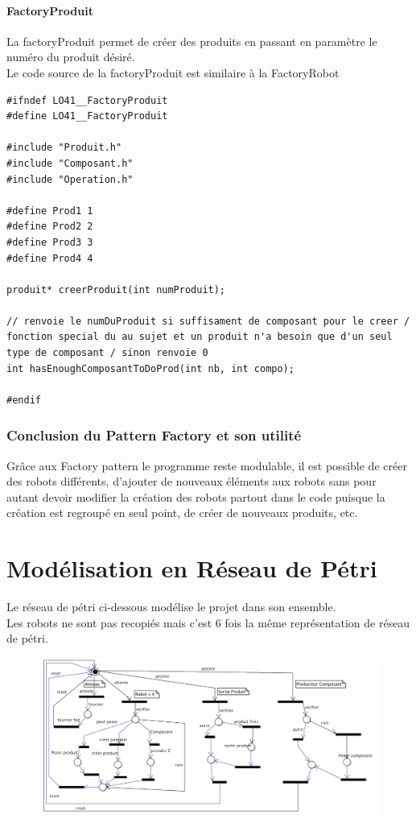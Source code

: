 \documentclass{report}
\begin{document}
\subsubsection{FactoryProduit}
La factoryProduit permet de créer des produits en passant en paramètre le numéro du produit désiré.\\
Le code source de la factoryProduit est similaire à la FactoryRobot
\begin{lstlisting}[caption=Factory des Produits]
#ifndef LO41__FactoryProduit
#define LO41__FactoryProduit

#include "Produit.h"
#include "Composant.h"
#include "Operation.h"

#define Prod1 1
#define Prod2 2
#define Prod3 3
#define Prod4 4

produit* creerProduit(int numProduit);

// renvoie le numDuProduit si suffisament de composant pour le creer / fonction special du au sujet et un produit n'a besoin que d'un seul type de composant / sinon renvoie 0
int hasEnoughComposantToDoProd(int nb, int compo);

#endif
\end{lstlisting}

\subsection{Conclusion du Pattern Factory et son utilité}
Grâce aux Factory pattern le programme reste modulable, il est possible de créer des robots différents, d'ajouter de nouveaux éléments aux robots sans pour autant devoir modifier la création des robots partout dans le code puisque la création est regroupé en seul point, de créer de nouveaux produits, etc.

\chapter{Modélisation en Réseau de Pétri}
Le réseau de pétri ci-dessous modélise le projet dans son ensemble.\\
Les robots ne sont pas recopiés mais c'est 6 fois la même représentation de réseau de pétri.
\begin{figure}[!p!t]
\center
\includegraphics[angle=90,width=320pt]{rdp.png}
\end{figure}
\end{document}
